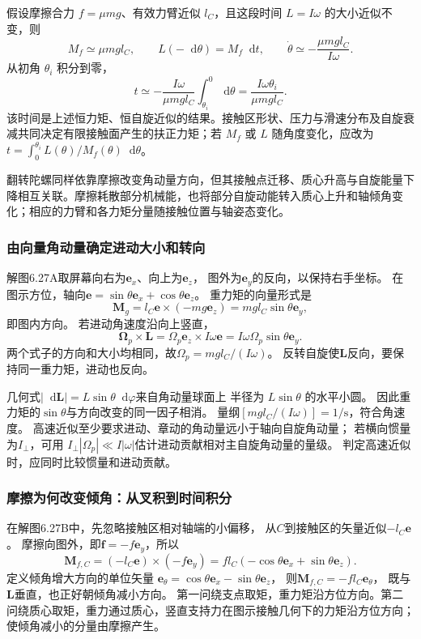 \documentclass[UTF8,fontset=fandol,a4paper,11pt]{ctexart}
\newcommand{\dd}{\mathop{}\!\mathrm{d}}
\newcommand{\result}[1]{\begin{equation*}\boxed{#1}\end{equation*}}
\begin{document}
假设摩擦合力 $f=\mu mg$、有效力臂近似 $l_C$，且这段时间 $L=I\omega$ 的大小近似不变，则
\[
 M_f\simeq\mu mgl_C,\qquad L(-\dd\theta)=M_f\dd t,
 \qquad \dot\theta\simeq-\frac{\mu mgl_C}{I\omega}.
\]
从初角 $\theta_i$ 积分到零，
\[
 t\simeq-\frac{I\omega}{\mu mgl_C}\int_{\theta_i}^0\dd\theta
 =\result{\frac{I\omega\theta_i}{\mu mgl_C}}.
\]
该时间是上述恒力矩、恒自旋近似的结果。接触区形状、压力与滑速分布及自旋衰减共同决定有限接触面产生的扶正力矩；若 $M_f$ 或 $L$ 随角度变化，应改为 $t=\int_0^{\theta_i}L(\theta)/M_f(\theta)\dd\theta$。

翻转陀螺同样依靠摩擦改变角动量方向，但其接触点迁移、质心升高与自旋能量下降相互关联。摩擦耗散部分机械能，也将部分自旋动能转入质心上升和轴倾角变化；相应的力臂和各力矩分量随接触位置与轴姿态变化。
\subsubsection*{由向量角动量确定进动大小和转向}
解图6.27A取屏幕向右为$\boldsymbol e_x$、向上为$\boldsymbol e_z$，
图外为$\boldsymbol e_y$的反向，以保持右手坐标。
在图示方位，轴向$\boldsymbol e=\sin\theta\boldsymbol e_x+\cos\theta\boldsymbol e_z$。
重力矩的向量形式是
\[
\boldsymbol M_g=l_C\boldsymbol e\times(-mg\boldsymbol e_z)
=mgl_C\sin\theta\boldsymbol e_y,
\]
即图内方向。
若进动角速度沿向上竖直，
\[
\boldsymbol\Omega_p\times\boldsymbol L
=\Omega_p\boldsymbol e_z\times I\omega\boldsymbol e
=I\omega\Omega_p\sin\theta\boldsymbol e_y.
\]
两个式子的方向和大小均相同，故$\Omega_p=mgl_C/(I\omega)$。
反转自旋使$\boldsymbol L$反向，要保持同一重力矩，进动也反向。

几何式$|\dd\boldsymbol L|=L\sin\theta\dd\varphi$来自角动量球面上
半径为 $L\sin\theta$ 的水平小圆。
因此重力矩的$\sin\theta$与方向改变的同一因子相消。
量纲$[mgl_C/(I\omega)]=1/\mathrm s$，符合角速度。
高速近似至少要求进动、章动的角动量远小于轴向自旋角动量；
若横向惯量为$I_\perp$，可用
$I_\perp|\Omega_p|\ll I|\omega|$估计进动贡献相对主自旋角动量的量级。
判定高速近似时，应同时比较惯量和进动贡献。

\subsubsection*{摩擦为何改变倾角：从叉积到时间积分}
在解图6.27B中，先忽略接触区相对轴端的小偏移，
从$C$到接触区的矢量近似$-l_C\boldsymbol e$。
摩擦向图外，即$\boldsymbol f=-f\boldsymbol e_y$，所以
\[
\boldsymbol M_{f,C}=(-l_C\boldsymbol e)\times(-f\boldsymbol e_y)
=fl_C(-\cos\theta\boldsymbol e_x+\sin\theta\boldsymbol e_z).
\]
定义倾角增大方向的单位矢量
$\boldsymbol e_\theta=\cos\theta\boldsymbol e_x-\sin\theta\boldsymbol e_z$，
则$\boldsymbol M_{f,C}=-fl_C\boldsymbol e_\theta$，
既与$\boldsymbol L$垂直，也正好朝倾角减小方向。
第一问绕支点取矩，重力矩沿方位方向。第二问绕质心取矩，重力通过质心，竖直支持力在图示接触几何下的力矩沿方位方向；使倾角减小的分量由摩擦产生。
\end{document}
